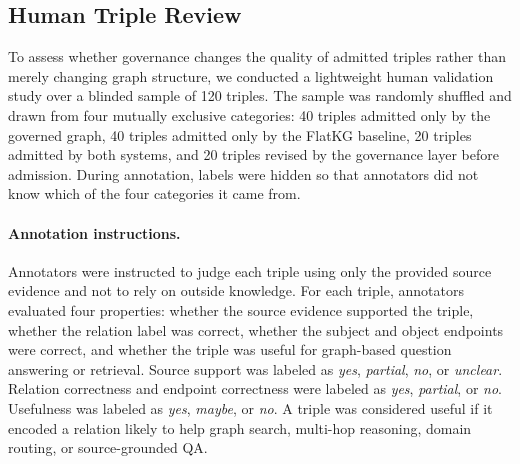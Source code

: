 \documentclass{article}
\begin{document}
\subsection{Human Triple Review}


To assess whether governance changes the quality of admitted triples rather than merely changing graph structure, we conducted a lightweight human validation study over a blinded sample of 120 triples. The sample was randomly shuffled and drawn from four mutually exclusive categories: 40 triples admitted only by the governed graph, 40 triples admitted only by the FlatKG baseline, 20 triples admitted by both systems, and 20 triples revised by the governance layer before admission. During annotation, labels were hidden so that annotators did not know which of the four categories it came from.

\paragraph{Annotation instructions.}
Annotators were instructed to judge each triple using only the provided source evidence and not to rely on outside knowledge. For each triple, annotators evaluated four properties: whether the source evidence supported the triple, whether the relation label was correct, whether the subject and object endpoints were correct, and whether the triple was useful for graph-based question answering or retrieval. Source support was labeled as \emph{yes}, \emph{partial}, \emph{no}, or \emph{unclear}. Relation correctness and endpoint correctness were labeled as \emph{yes}, \emph{partial}, or \emph{no}. Usefulness was labeled as \emph{yes}, \emph{maybe}, or \emph{no}. A triple was considered useful if it encoded a relation likely to help graph search, multi-hop reasoning, domain routing, or source-grounded QA.
\end{document}

